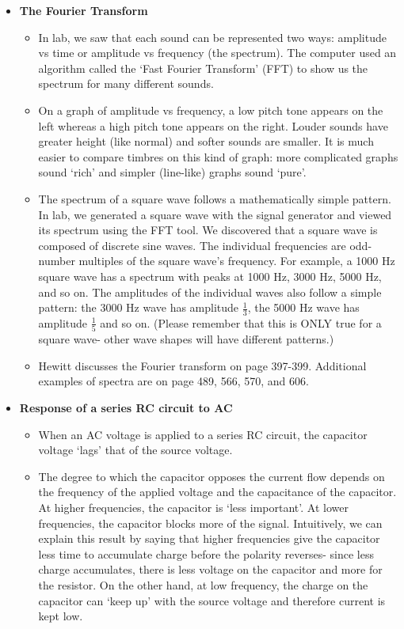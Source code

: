 \documentclass{article}
\begin{document}
\begin{itemize}
\newpage{}

\item \textbf{The Fourier Transform}
  \begin{itemize}
    \item In lab, we saw that each sound can be represented two ways:
          amplitude vs time or amplitude vs frequency (the spectrum). The 
          computer used an algorithm called the `Fast Fourier Transform' (FFT) 
          to show us the spectrum for many different sounds.
    \item On a graph of amplitude vs frequency, a low pitch tone appears on the
          left whereas a high pitch tone appears on the right. Louder sounds
          have greater height (like normal) and softer sounds are smaller. It
          is much easier to compare timbres on this kind of graph: more 
          complicated graphs sound `rich' and simpler (line-like) graphs 
          sound `pure'.
    \item The spectrum of a square wave follows a mathematically simple 
          pattern. In lab, we generated a square wave with the signal 
          generator and viewed its spectrum using the FFT tool. We 
          discovered that a square wave is composed of discrete sine waves.
          The individual frequencies are odd-number multiples of the 
          square wave's frequency. For example, a 1000 Hz square wave has
          a spectrum with peaks at 1000 Hz, 3000 Hz, 5000 Hz, and so on.
          The amplitudes of the individual waves also follow a simple pattern: 
          the 3000 Hz wave has amplitude $\frac{1}{3}$, the 5000 Hz wave has 
          amplitude $\frac{1}{5}$ and so on. 
          (Please remember that this is ONLY true for a square wave- other 
          wave shapes will have different patterns.)
    \item Hewitt discusses the Fourier transform on page 397-399. Additional 
          examples of spectra are on page 489, 566, 570, and 606.
  \end{itemize}

\item \textbf{Response of a series RC circuit to AC}
  \begin{itemize}
    \item When an AC voltage is applied to a series RC circuit, the capacitor
          voltage `lags' that of the source voltage.
    \item The degree to which the capacitor opposes the current flow depends
          on the frequency of the applied voltage and the capacitance of the
          capacitor. At higher frequencies, the capacitor is `less important'.
          At lower frequencies, the capacitor blocks more of the signal.
          Intuitively, we can explain this result by saying that higher
          frequencies give the capacitor less time to accumulate charge before
          the polarity reverses- since less charge accumulates, there is less 
          voltage on the capacitor and more for the resistor. On the other hand,
          at low frequency, the charge on the capacitor can `keep up' with the
          source voltage and therefore current is kept low.
  \end{itemize}


\end{itemize}
\end{document}
